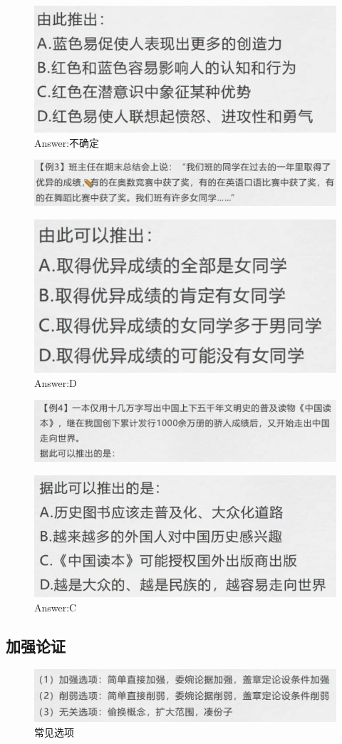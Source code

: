 \documentclass{article}
\numberwithin{equation}{section}						%
\numberwithin{figure}{section}							%
\begin{document}
\begin{sloppypar}
\begin{figure}[H]
     \centering
     \includegraphics[width=0.4\linewidth]{212.png}
		\caption{Answer:不确定}
\end{figure}


\begin{figure}[H]
     \centering
     \includegraphics[width=0.6\linewidth]{213.png}
\end{figure}

\begin{figure}[H]
     \centering
     \includegraphics[width=0.25\linewidth]{214.png}
		\caption{Answer:D}
\end{figure}


\begin{figure}[H]
     \centering
     \includegraphics[width=0.6\linewidth]{215.png}
\end{figure}

\begin{figure}[H]
     \centering
     \includegraphics[width=0.3\linewidth]{216.png}
		\caption{Answer:C}
\end{figure}

\subsection{加强论证}

\begin{figure}[H]
     \centering
     \includegraphics[width=0.6\linewidth]{217.png}
	  \caption{常见选项}
\end{figure}


\end{sloppypar}
\end{document}
